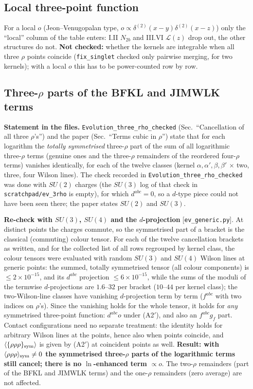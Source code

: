 \subsection{Local three-point function}\label{sec:dabc-local}
\noindent For a local $o$ (Jeon--Venugopalan type, $o\propto\delta^{(2)}(x-y)\delta^{(2)}(x-z)$) only the ``local'' column of the table enters: I.II $N_{2b}$ and III.VI $\mathcal{L}(z)$ drop out, the other structures do not. \textbf{Not checked:} whether the kernels are integrable when all three $\rho$ points coincide (\texttt{fix\_singlet} checked only pairwise merging, for two kernels); with a local $o$ this has to be power-counted row by row.

\subsection{Three-$\rho$ parts of the BFKL and JIMWLK terms}\label{sec:dabc-evol}
\noindent \textbf{Statement in the files.} \texttt{Evolution\_three\_rho\_checked} (Sec.~``Cancellation of all three $\rho$'s'') and the paper (Sec.~``Terms cubic in $\rho$'') state that for each logarithm the \emph{totally symmetrised} three-$\rho$ part of the sum of all logarithmic three-$\rho$ terms (genuine ones and the three-$\rho$ remainders of the reordered four-$\rho$ terms) vanishes identically, for each of the twelve classes (kernel $\alpha,\alpha',\beta,\beta'$ $\times$ two, three, four Wilson lines). The check recorded in \texttt{Evolution\_three\_rho\_checked} was done with $SU(2)$ charges (the $SU(3)$ log of that check in \texttt{scratchpad/ev\_3rho} is empty), for which $d^{abc}=0$, so a $d$-type piece could not have been seen there; the paper states $SU(2)$ and $SU(3)$.\par
\noindent\textbf{Re-check with $SU(3)$, $SU(4)$ and the $d$-projection} [\texttt{ev\_generic.py}]. At distinct points the charges commute, so the symmetrised part of a bracket is the classical (commuting) colour tensor. For each of the twelve cancellation brackets as written, and for the collected list of all rows regrouped by kernel class, the colour tensors were evaluated with random $SU(3)$ and $SU(4)$ Wilson lines at generic points: the summed, totally symmetrised tensor (all colour components) is $\le2\times10^{-15}$, and its $d^{abc}$ projection $\le6\times10^{-15}$, while the sums of the moduli of the termwise $d$-projections are $1.6$--$32$ per bracket ($10$--$44$ per kernel class); the two-Wilson-line classes have vanishing $d$-projection term by term ($f^{abc}$ with two indices on $\rho$'s). Since the vanishing holds for the whole tensor, it holds for \emph{any} symmetrised three-point function: $d^{abc}o$ under (A2$'$), and also an $f^{abc}g_{f}$ part. Contact configurations need no separate treatment: the identity holds for arbitrary Wilson lines at the points, hence also when points coincide, and $\langle\{\rho\rho\rho\}_{\rm sym}\rangle$ is given by (A2$'$) at coincident points as well. \textbf{Result: with $\langle\rho\rho\rho\rangle_{\rm sym}\neq0$ the symmetrised three-$\rho$ parts of the logarithmic terms still cancel; there is no $\ln$-enhanced term $\propto o$}. The two-$\rho$ remainders (part of the BFKL and JIMWLK terms) and the one-$\rho$ remainders (zero average) are not affected.\par
